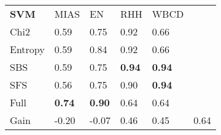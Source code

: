 \begin{tabular}{|l|l|l|l|l|l}
\cline{1-5}
        \textbf{SVM} & MIAS              & EN                & RHH               & WBCD      &         \\
\cline{1-5}
Chi2    &  0.59 &  0.75 & 0.92 & 0.66 \\
Entropy &  0.59 &  0.84 & 0.92 & 0.66 \\
SBS     &  0.59 &  0.75 & \textbf{0.94} & \textbf{0.94} \\
SFS     &  0.56 &  0.75 & 0.90 & \textbf{0.94} \\
Full    &  \textbf{0.74} &  \textbf{0.90} & 0.64 & 0.64 \\
\cline{1-5}
Gain    & -0.20 & -0.07 & 0.46 & 0.45 & 0.64 \\
\cline{1-5}
\end{tabular}
